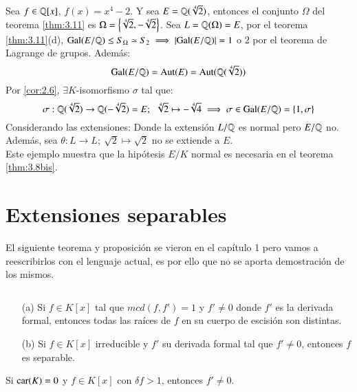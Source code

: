 \begin{eg}
    Sea $f \in \mathbb{Q}[x]$, $f(x) = x^4 - 2$. Y sea $E = \mathbb{Q}(\sqrt[4] 2)$, entonces el conjunto $\Omega$ del teorema \ref{thm:3.11} es $\Omega = \left\{\sqrt[4] 2, -\sqrt[4] 2\right\}$. Sea $L = \mathbb{Q}(\Omega) = E$, por el teorema \ref{thm:3.11}(d), $\mathrm{Gal}(E/\mathbb{Q}) \leq S_\Omega \simeq S_2 \implies |\mathrm{Gal}(E/\mathbb{Q})| = 1$ o $2$ por el teorema de Lagrange de grupos. Además:
    $$
        \mathrm{Gal}(E/\mathbb{Q}) = \mathrm{Aut}(E) = \mathrm{Aut}(\mathbb{Q}(\sqrt[4]{2}))
    $$
    Por \ref{cor:2.6}, $\exists K$-isomorfismo $\sigma$ tal que:
    $$
        \sigma: \mathbb{Q}(\sqrt[4]{2}) \to \mathbb{Q}(-\sqrt[4] 2) = E;\ \ \sqrt[4]{2} \mapsto -\sqrt[4]{4} \implies \sigma \in \mathrm{Gal}(E/\mathbb{Q}) = \left\{1, \sigma\right\}
    $$
    Considerando las extensiones:
    Donde la extensión $L/\mathbb{Q}$ es normal pero $E/\mathbb{Q}$ no.  Además, sea $\theta: L \to L;\ \sqrt 2 \mapsto \sqrt 2$ no se extiende a $E$.\\

    Este ejemplo muestra que la hipótesis $E/K$ normal es necesaria en el teorema \ref{thm:3.8bis}.
\end{eg}

\section{Extensiones separables}

El siguiente teorema y proposición se vieron en el capítulo 1 pero vamos a reescribirlos con el lenguaje actual, es por ello que no se aporta demostración de los mismos.

\begin{thm}\label{thm:3.13}\label{thm:3.4.1}$ $
    \begin{itemize}
        \item[(a)] Si $f \in K[x]$ tal que $mcd(f, f') = 1$ y $f' \neq 0$ donde $f'$ es la derivada formal, entonces todas las raíces de $f$ en su cuerpo de escisión son distintas.
        \item[(b)] Si $f \in K[x]$ irreducible y $f'$ su derivada formal tal que $f' \neq 0$, entonces $f$ es separable.
    \end{itemize}
\end{thm}
\begin{obs}
    Si $\mathrm{car}(K) = 0$ y $f\in K[x]$ con $\delta f > 1$, entonces $f' \neq 0$.
\end{obs}

